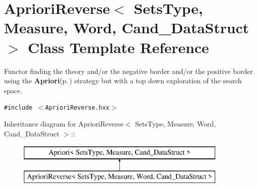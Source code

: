 \section{Apriori\-Reverse$<$ Sets\-Type, Measure, Word, Cand\_\-Data\-Struct $>$ Class Template Reference}
\label{class_apriori_reverse}
Functor finding the theory and/or the negative border and/or the positive border using the {\bf Apriori}{\rm (p.\,\pageref{class_apriori})} strategy but with a top down exploration of the search space.  


{\tt \#include $<$Apriori\-Reverse.hxx$>$}

Inheritance diagram for Apriori\-Reverse$<$ Sets\-Type, Measure, Word, Cand\_\-Data\-Struct $>$::\begin{figure}[H]
\begin{center}
\leavevmode
\includegraphics[height=2cm]{class_apriori_reverse}
\end{center}
\end{figure}
